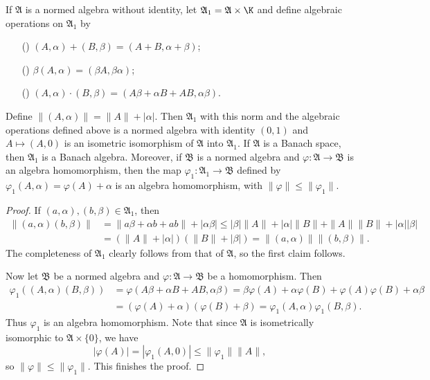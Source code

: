 \begin{proposition}\label{norm algebra adjoining identity}
If $\mathfrak{A}$ is a normed algebra without identity, let $\mathfrak{A}_1=\mathfrak{A}\times\K$ and define algebraic operations on $\mathfrak{A}_1$ by
\begin{itemize}
\item[(\rmnum{1})] $(A,\alpha)+(B,\beta)=(A+B,\alpha+\beta)$;
\item[(\rmnum{2})] $\beta(A,\alpha)=(\beta A,\beta\alpha)$;
\item[(\rmnum{3})] $(A,\alpha)\cdot(B,\beta)=(A\beta+\alpha B+AB,\alpha\beta)$.
\end{itemize}
Define $\|(A,\alpha)\|=\|A\|+|\alpha|$. Then $\mathfrak{A}_1$ with this norm and the algebraic operations defined above is a normed algebra with identity $(0,1)$ and $A\mapsto(A,0)$ is an isometric isomorphism of $\mathfrak{A}$ into $\mathfrak{A}_1$. If $\mathfrak{A}$ is a Banach space, then $\mathfrak{A}_1$ is a Banach algebra. Moreover, if $\mathfrak{B}$ is a normed algebra and $\varphi:\mathfrak{A}\to\mathfrak{B}$ is an algebra homomorphism, then the map $\varphi_1:\mathfrak{A}_1\to\mathfrak{B}$ defined by $\varphi_1(A,\alpha)=\varphi(A)+\alpha$ is an algebra homomorphism, with $\|\varphi\|\leq\|\varphi_1\|$.
\end{proposition}
\begin{proof}
If $(a,\alpha),(b,\beta)\in\mathfrak{A}_1$, then
\begin{align*}
\|(a,\alpha)(b,\beta)\|&=\|a\beta+\alpha b+ab\|+|\alpha\beta|\leq|\beta|\|A\|+|\alpha|\|B\|+\|A\|\|B\|+|\alpha||\beta|\\
&=(\|A\|+|\alpha|)(\|B\|+|\beta|)=\|(a,\alpha)\|\|(b,\beta)\|.
\end{align*}
The completeness of $\mathfrak{A}_1$ clearly follows from that of $\mathfrak{A}$, so the first claim follows.\par
Now let $\mathfrak{B}$ be a normed algebra and $\varphi:\mathfrak{A}\to\mathfrak{B}$ be a homomorphism. Then
\begin{align*}
\varphi_1((A,\alpha)(B,\beta))&=\varphi(A\beta+\alpha B+AB,\alpha\beta)=\beta\varphi(A)+\alpha\varphi(B)+\varphi(A)\varphi(B)+\alpha\beta\\
&=(\varphi(A)+\alpha)(\varphi(B)+\beta)=\varphi_1(A,\alpha)\varphi_1(B,\beta).
\end{align*}
Thus $\varphi_1$ is an algebra homomorphism. Note that since $\mathfrak{A}$ is isometrically isomorphic to $\mathfrak{A}\times\{0\}$, we have
\[|\varphi(A)|=|\varphi_1(A,0)|\leq\|\varphi_1\|\|A\|,\]
so $\|\varphi\|\leq\|\varphi_1\|$. This finishes the proof.
\end{proof}
